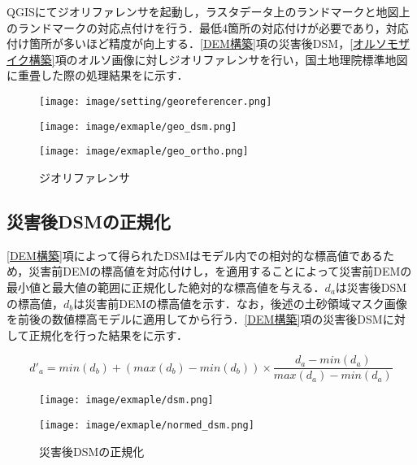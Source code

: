       QGISにてジオリファレンサを起動し，ラスタデータ上のランドマークと地図上のランドマークの対応点付けを行う．最低4箇所の対応付けが必要であり，対応付け箇所が多いほど精度が向上する．\ref{DEM構築}項の災害後DSM，\ref{オルソモザイク構築}項のオルソ画像に対しジオリファレンサを行い，国土地理院標準地図\cite{標準地図}に重畳した際の処理結果をに示す．
      
      \begin{figure}[t]
        \begin{minipage}[c]{0.329\hsize}
          \centering
          \texttt{[image: image/setting/georeferencer.png]}
        \end{minipage}
        \begin{minipage}[c]{0.329\hsize}
          \centering
          \texttt{[image: image/exmaple/geo\_dsm.png]}
        \end{minipage}
        \begin{minipage}[c]{0.329\hsize}
          \centering
          \texttt{[image: image/exmaple/geo\_ortho.png]}
        \end{minipage}
        \caption{ジオリファレンサ}
        \label{ジオリファレンサ結果}
      \end{figure}


    \subsection{災害後DSMの正規化}
      \label{災害後DSMの正規化}
      \ref{DEM構築}項によって得られたDSMはモデル内での相対的な標高値であるため，災害前DEMの標高値を対応付けし，を適用することによって災害前DEMの最小値と最大値の範囲に正規化した絶対的な標高値を与える．$d_{a}$は災害後DSMの標高値，$d_{b}$は災害前DEMの標高値を示す．なお，後述の土砂領域マスク画像を前後の数値標高モデルに適用してから行う．\ref{DEM構築}項の災害後DSMに対して正規化を行った結果をに示す．

      \begin{equation}
        \label{正規化}
        d'_{a} =  
          min(d_{b}) + (max(d_{b}) - min(d_{b})) \times
          \dfrac{d_{a} - min(d_{a})} {max(d_{a}) - min(d_{a})}
      \end{equation}

      \begin{figure}[t]
        \begin{minipage}[c]{0.45\hsize}
          \centering
          \texttt{[image: image/exmaple/dsm.png]}
        \end{minipage}
        \begin{minipage}[c]{0.45\hsize}
          \centering
          \texttt{[image: image/exmaple/normed\_dsm.png]}
        \end{minipage}
        \caption{災害後DSMの正規化}
        \label{災害後DSMの正規化結果}
      \end{figure}

